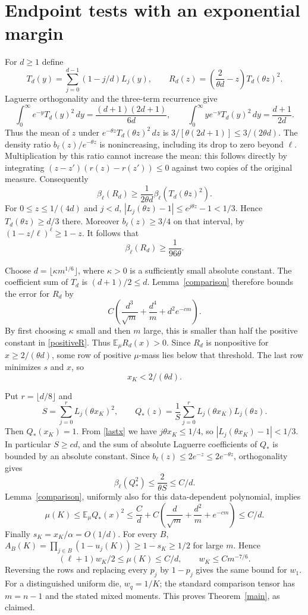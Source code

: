 \documentclass[11pt]{article}
\newcommand{\E}{\mathbb E}
\begin{document}
\section*{Endpoint tests with an exponential margin}
For $d\ge1$ define
\[
 T_d(y)=\sum_{j=0}^{d-1}(1-j/d)L_j(y),\qquad
 R_d(z)=\left(\frac{2}{\theta d}-z\right)T_d(\theta z)^2.
\]
Laguerre orthogonality and the three-term recurrence give
\[
 \int_0^\infty e^{-y}T_d(y)^2\,dy
   =\frac{(d+1)(2d+1)}{6d},\qquad
 \int_0^\infty ye^{-y}T_d(y)^2\,dy
   =\frac{d+1}{2d}.
\]
Thus the mean of $z$ under $e^{-\theta z}T_d(\theta z)^2\,dz$
is $3/[\theta(2d+1)]\le3/(2\theta d)$.
The density ratio $b_\ell(z)/e^{-\theta z}$ is nonincreasing,
including its drop to zero beyond $\ell$. Multiplication by this
ratio cannot increase the mean: this follows directly by integrating
$(z-z')(r(z)-r(z'))\le0$ against two copies of the original measure.
Consequently
\[
 \beta_\ell(R_d)
 \ge\frac1{2\theta d}\beta_\ell(T_d(\theta z)^2).
\]
For $0\le z\le1/(4d)$ and $j<d$,
$|L_j(\theta z)-1|\le e^{j\theta z}-1<1/3$.
Hence $T_d(\theta z)\ge d/3$ there. Moreover $b_\ell(z)\ge3/4$
on that interval, by $(1-z/\ell)^\ell\ge1-z$.
It follows that
\begin{equation}\label{positiveR}
 \beta_\ell(R_d)\ge\frac1{96\theta}.
\end{equation}

Choose $d=\lfloor\kappa m^{1/6}\rfloor$, where $\kappa>0$ is a
sufficiently small absolute constant. The coefficient sum of $T_d$
is $(d+1)/2\le d$. Lemma~\ref{comparison} therefore bounds the error
for $R_d$ by
\[
 C\left(\frac{d^3}{\sqrt m}+\frac{d^4}{m}+d^2e^{-cm}\right).
\]
By first choosing $\kappa$ small and then $m$ large, this is smaller
than half the positive constant in \eqref{positiveR}.
Thus $\E_\mu R_d(x)>0$. Since $R_d$ is nonpositive for
$x\ge2/(\theta d)$, some row of positive $\mu$-mass lies below
that threshold. The last row minimizes $s$ and $x$, so
\begin{equation}\label{lastx}
 x_K<2/(\theta d).
\end{equation}

Put $r=\lfloor d/8\rfloor$ and
\[
 S=\sum_{j=0}^{r}L_j(\theta x_K)^2,
 \qquad Q_*(z)=\frac1S\sum_{j=0}^{r}
              L_j(\theta x_K)L_j(\theta z).
\]
Then $Q_*(x_K)=1$. From \eqref{lastx} we have
$j\theta x_K\le1/4$, so $|L_j(\theta x_K)-1|<1/3$.
In particular $S\ge c d$, and the sum of absolute Laguerre
coefficients of $Q_*$ is bounded by an absolute constant.
Since $b_\ell(z)\le2e^{-z}\le2e^{-\theta z}$,
orthogonality gives
\[
 \beta_\ell(Q_*^2)\le\frac2{\theta S}\le C/d.
\]
Lemma~\ref{comparison}, uniformly also for this data-dependent
polynomial, implies
\[
 \mu(K)\le\E_\mu Q_*(x)^2
 \le \frac Cd+C\left(\frac d{\sqrt m}+\frac{d^2}{m}+e^{-cm}\right)
 \le C/d.
\]
Finally $s_K=x_K/\alpha=O(1/d)$. For every $B$,
$A_B(K)=\prod_{j\in B}(1-u_j(K))\ge1-s_K\ge1/2$ for large $m$.
Hence
\[
 (\ell+1)w_K/2\le\mu(K)\le C/d,
 \qquad w_K\le C m^{-7/6}.
\]
Reversing the rows and replacing every $p_j$ by $1-p_j$ gives the
same bound for $w_1$. For a distinguished uniform die, $w_q=1/K$;
the standard comparison tensor has $m=n-1$ and the stated mixed moments.
This proves Theorem~\ref{main}, as claimed.
\end{document}
